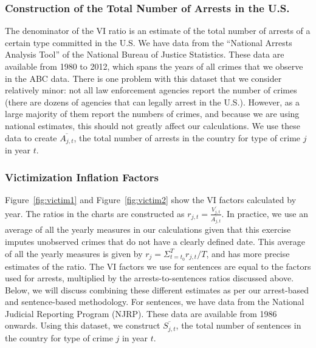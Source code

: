 \subsubsection{Construction of the Total Number of Arrests in the U.S.}
\noindent The denominator of the VI ratio is an estimate of the total number of arrests of a certain type committed in the U.S. We have data from the ``National Arrests Analysis Tool'' of the National Bureau of Justice Statistics. These data are available from 1980 to 2012, which spans the years of all crimes that we observe in the ABC data. There is one problem with this dataset that we consider relatively minor: not all law enforcement agencies report the number of crimes (there are dozens of agencies that can legally arrest in the U.S.). However, as a large majority of them report the numbers of crimes, and because we are using national estimates, this should not greatly affect our calculations. We use these data to create $\overline{A_{j,t}}$, the total number of arrests in the country for type of crime $j$ in year $t$. \\

\subsubsection{Victimization Inflation Factors} 

\noindent Figure~\ref{fig:victim1} and Figure~\ref{fig:victim2} show the VI factors calculated by year. The ratios in the charts are constructed as $r_{j,t}=\frac{\overline{V_{j,t}}}{\overline{A_{j,t}}}$. In practice, we use an average of all the yearly measures in our calculations given that this exercise imputes unobserved crimes that do not have a clearly defined date. This average of all the yearly measures is given by $r_j=\Sigma_{t=t_0}^{T}r_{j,t}/T$, and has more precise estimates of the ratio. The VI factors we use for sentences are equal to the factors used for arrests, multiplied by the arrests-to-sentences ratios discussed above. Below, we will discuss combining these different estimates as per our arrest-based and sentence-based methodology. For sentences, we have data from the National Judicial Reporting Program (NJRP). These data are available from 1986 onwards. Using this dataset, we construct $\overline{S_{j,t}}$, the total number of sentences in the country for type of crime $j$ in year $t$. \\

